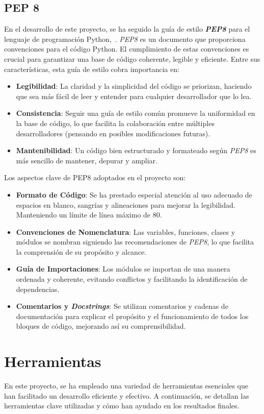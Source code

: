 \subsection{PEP 8}
En el desarrollo de este proyecto, se ha seguido la guía de estilo \textbf{\textit{PEP8}} para el lenguaje de programación Python,~\cite{Guia:PEP8}. \textit{PEP8} es un documento que proporciona convenciones para el código Python. El cumplimiento de estas convenciones es crucial para garantizar una base de código coherente, legible y eficiente.  
Entre sus características, esta guía de estilo cobra importancia en:
\begin{itemize}
	\item \textbf{Legibilidad}: La claridad y la simplicidad del código se priorizan, haciendo que sea más fácil de leer y entender para cualquier desarrollador que lo lea.
	\item \textbf{Consistencia}: Seguir una guía de estilo común promueve la uniformidad en la base de código, lo que facilita la colaboración entre múltiples desarrolladores (pensando en posibles modificaciones futuras).
	\item \textbf{Mantenibilidad}: Un código bien estructurado y formateado según \textit{PEP8} es más sencillo de mantener, depurar y ampliar.
\end{itemize}
Los aspectos clave de PEP8 adoptados en el proyecto son:
\begin{itemize}
	\item \textbf{Formato de Código}: Se ha prestado especial atención al uso adecuado de espacios en blanco, sangrías y alineaciones para mejorar la legibilidad. Manteniendo un límite de línea máximo de 80.
	\item \textbf{Convenciones de Nomenclatura}: Las variables, funciones, clases y módulos se nombran siguiendo las recomendaciones de \textit{PEP8}, lo que facilita la comprensión de su propósito y alcance.
	\item \textbf{Guía de Importaciones}: Los módulos se importan de una manera ordenada y coherente, evitando conflictos y facilitando la identificación de dependencias.
	\item \textbf{Comentarios y \textit{Docstrings}}: Se utilizan comentarios y cadenas de documentación para explicar el propósito y el funcionamiento de todos los bloques de código, mejorando así su comprensibilidad.
\end{itemize}

\section{Herramientas}
En este proyecto, se ha empleado una variedad de herramientas esenciales que han facilitado un desarrollo eficiente y efectivo. A continuación, se detallan las herramientas clave utilizadas y cómo han ayudado en los resultados finales.

